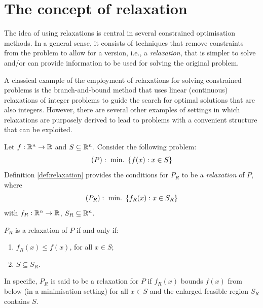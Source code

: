 \section{The concept of relaxation}

The idea of using relaxations is central in several constrained optimisation methods. In a general sense, it consists of techniques that remove constraints from the problem to allow for a version, i.e., a \emph{relaxation}, that is simpler to solve and/or can provide information to be used for solving the original problem. 

A classical example of the employment of relaxations for solving constrained problems is the branch-and-bound method that uses linear (continuous) relaxations of integer problems to guide the search for optimal solutions that are also integers. However, there are several other examples of settings in which relaxations are purposely derived to lead to problems with a convenient structure that can be exploited. 

Let $f:\mathbb{R}^n \rightarrow \mathbb{R}$ and $S \subseteq \mathbb{R}^n$. Consider the following problem:
%
$$
	(P) :~ \mathop{\text{min.~}} \left\{  f(x) : x \in S \right \} 
$$
%
Definition \ref{def:relaxation} provides the conditions for $P_R$ to be a \emph{relaxation} of $P$, where
%
$$
	(P_R) :~ \mathop{\text{min.~}} \left\{ f_R(x) : x \in S_R \right \}
$$
%
with $f_R:\mathbb{R}^n \rightarrow \mathbb{R}$, $S_R \subseteq \mathbb{R}^n$. 
%
\begin{definition}[Relaxation] \label{def:relaxation}
	$P_R$ is a relaxation of $P$ if and only if:
	\begin{enumerate}
		\item $f_R(x) \leq f(x)$, for all $x \in S$;
		\item $S \subseteq S_R$.
	\end{enumerate} 
\end{definition}
%
In specific, $P_R$ is said to be a relaxation for $P$ if $f_R(x)$ bounds $f(x)$ from below (in a minimisation setting) for all $x \in S$ and the enlarged feasible region $S_R$ contains $S$.

